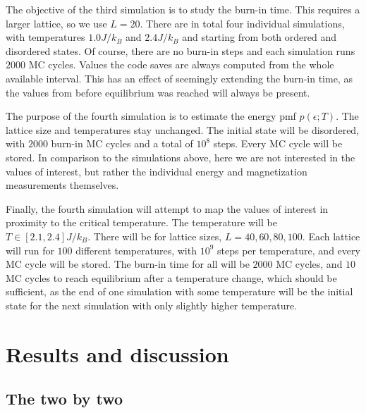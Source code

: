 \documentclass[english,notitlepage,reprint,nofootinbib]{revtex4-1}  %
\begin{document}
The objective of the third simulation is to study the burn-in time. This requires a larger lattice, so we use $L=20$. There are in total four individual simulations, with temperatures $1.0 J/k_B$ and $2.4 J/k_B$ and starting from both ordered and disordered states. Of course, there are no burn-in steps and each simulation runs $2000$ MC cycles.
Values the code saves are always computed from the whole available interval. This has an effect of seemingly extending the burn-in time, as the values from before equilibrium was reached will always be present.

The purpose of the fourth simulation is to estimate the energy pmf $p(\epsilon ; T)$. The lattice size and temperatures stay unchanged. The initial state will be disordered, with $2000$ burn-in MC cycles and a total of $10^8$ steps. Every MC cycle will be stored. In comparison to the simulations above, here we are not interested in the values of interest, but rather the individual energy and magnetization measurements themselves.

Finally, the fourth simulation will attempt to map the values of interest in proximity to the critical temperature. The temperature will be $T 
\in [2.1,2.4] J/k_B$. There will be for lattice sizes, $L=40,60,80,100$. Each lattice will run for $100$ different temperatures, with $10^9$ steps per temperature, and every MC cycle will be stored. The burn-in time for all will be $2000$ MC cycles, and $10$ MC cycles to reach equilibrium after a temperature change, which should be sufficient, as the end of one simulation with some temperature will be the initial state for the next simulation with only slightly higher temperature.

























\section{Results and discussion}\label{sec:results_and_discussion}
%


\subsection{The two by two}
\end{document}
